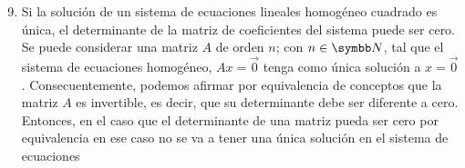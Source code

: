 \begin{enumerate}[label=\listAlph]
        \setcounter{enumii}{8}
        \item Si la solución de un sistema de ecuaciones lineales homogéneo cuadrado es única, el determinante de la matriz de coeficientes del sistema puede ser cero. \\
            Se puede considerar una matriz \(A\) de orden \(n\); con \(n \in \realN\), tal que el sistema de ecuaciones homogéneo, \(Ax = \vec{0}\) tenga como única solución
            a \(x = \vec{0}\). Consecuentemente, podemos afirmar por equivalencia de conceptos que la matriz \(A\) es invertible, es decir, que su determinante debe ser diferente 
            a cero. Entonces, en el caso que el determinante de una matriz pueda ser cero por equivalencia en ese caso no se va a tener una única solución en el sistema de ecuaciones 

\end{enumerate}
